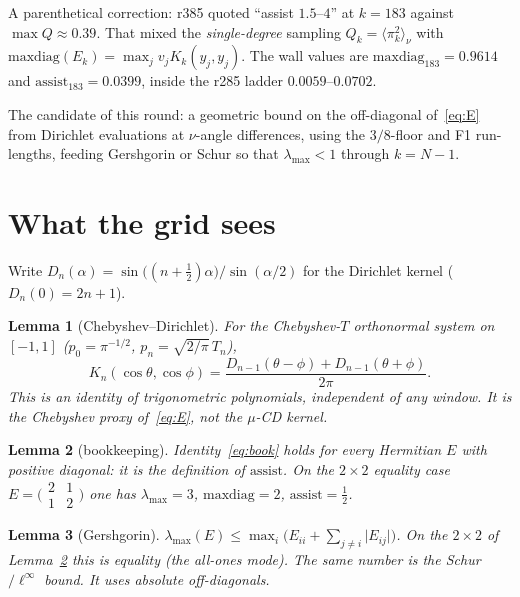 \documentclass[11pt]{article}
\newtheorem{lemma}{Lemma}
\theoremstyle{remark}
\begin{document}
A parenthetical correction: r385 quoted ``assist $1.5$--$4$'' at
$k=183$ against $\max Q\approx 0.39$.  That mixed the
\emph{single-degree} sampling $Q_k=\langle\pi_k^2\rangle_\nu$ with
$\mathrm{maxdiag}(E_k)=\max_j v_j K_k(y_j,y_j)$.  The wall values
are $\mathrm{maxdiag}_{183}=0.9614$ and $\mathrm{assist}_{183}=0.0399$,
inside the r285 ladder $0.0059$--$0.0702$.

The candidate of this round: a geometric bound on the off-diagonal
of~\eqref{eq:E} from Dirichlet evaluations at $\nu$-angle
differences, using the $3/8$-floor and F1 run-lengths, feeding
Gershgorin or Schur so that $\lambda_{\max}<1$ through $k=N-1$.

\section{What the grid sees}\label{sec:grid}

Write $D_n(\alpha)=\sin\bigl((n+\tfrac12)\alpha\bigr)/\sin(\alpha/2)$
for the Dirichlet kernel ($D_n(0)=2n+1$).

\begin{lemma}[Chebyshev--Dirichlet]\label{lem:cd}
For the Chebyshev-$T$ orthonormal system on $[-1,1]$
($p_0=\pi^{-1/2}$, $p_n=\sqrt{2/\pi}\,T_n$),
\[
K_n(\cos\theta,\cos\phi)
=
\frac{D_{n-1}(\theta-\phi)+D_{n-1}(\theta+\phi)}{2\pi}.
\]
This is an identity of trigonometric polynomials, independent of
any window.  It is the Chebyshev \emph{proxy} of~\eqref{eq:E}, not
the $\mu$-CD kernel.
\end{lemma}

\begin{lemma}[bookkeeping]\label{lem:book}
Identity~\eqref{eq:book} holds for every Hermitian $E$ with
positive diagonal: it is the definition of $\mathrm{assist}$.
On the $2\times 2$ equality case
$E=\bigl(\begin{smallmatrix}2&1\\1&2\end{smallmatrix}\bigr)$
one has $\lambda_{\max}=3$, $\mathrm{maxdiag}=2$,
$\mathrm{assist}=\tfrac12$.
\end{lemma}

\begin{lemma}[Gershgorin]\label{lem:gersh}
$\lambda_{\max}(E)\le \max_i\bigl(E_{ii}+\sum_{j\neq i}\lvert E_{ij}\rvert\bigr)$.
On the $2\times 2$ of Lemma~\ref{lem:book} this is equality
(the all-ones mode).  The same number is the Schur $/\ell^\infty$
bound.  It uses \emph{absolute} off-diagonals.
\end{lemma}
\end{document}
